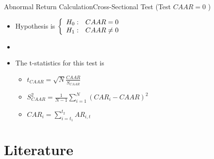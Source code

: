 \documentclass{beamer}
\begin{document}
	
	\begin{frame}{Abnormal Return Calculation}{Cross-Sectional Test (Test $ CAAR=0 $ )}
		
		\begin{itemize}
			\item Hypothesis is  $\left\{\begin{array}{c c }
				H_0: & CAAR=0\\
				H_1: & CAAR\neq 0
			\end{array}\right.
			$\\
			\item[]
			\item The t-statistics for this test is 
			\begin{itemize}
				\item 
				$
				t_{CAAR} = \sqrt{N}\frac{CAAR}{S_{CAAR}}
				$
				\item 
				$
				S^2_{CAAR} = \frac{1}{N-1}\sum_{i = 1}^{N}(CAR_i - {CAAR})^2
				$
				\item
				\scriptsize
				$ CAR_i = \sum_{i=t_1}^{t_2} AR_{i,t} $ 
				\normalsize 
			\end{itemize}
		\end{itemize}
		
	\end{frame}
	
	
	
	\section{Literature}
	
\end{document}
